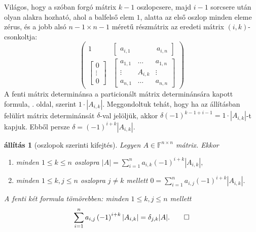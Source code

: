 \documentclass[9pt, a4paper, showtrims]{memoir}
\makeatletter
\renewenvironment{proof}[1][\proofname]
    {\par\pushQED{\qed}%
    \normalfont \topsep6\p@\@plus6\p@\relax
    \trivlist
    \item[\hskip\labelsep
        \itshape
    #1\@addpunct{:}]\ignorespaces}
    {\popQED\endtrivlist\@endpefalse}
\theoremstyle{plain}
\newtheorem{proposition}{állítás}[chapter]
\theoremstyle{remark}
\theoremstyle{definition}
\makeatother
\begin{document}
\begin{proof}
	Világos, hogy a szóban forgó mátrix $k-1$ oszlopcsere, 
    majd $i-1$ sorcsere után olyan alakra hozható,
	ahol a balfelső elem $1$, alatta az első oszlop minden eleme zérus,
	és a jobb alsó $n-1\times n-1$ méretű részmátrix az eredeti mátrix $\left( i,k \right)$-csonkoltja:
	\[
		\begin{pmatrix}
			1 & \begin{bmatrix}
				a_{i,1}\, & \phantom{A_{i,k}} & \,a_{i,n}
			\end{bmatrix} \\
			\begin{bmatrix}
				0      \\
				\vdots \\
				0
			\end{bmatrix}
			  &
			\begin{bmatrix}
				a_{1,1} & \dots   & a_{1,n} \\
				\vdots  & A_{i,k} & \vdots  \\
				a_{n,1} & \dots   & a_{n,n}
			\end{bmatrix}
		\end{pmatrix}
	\]
	A fenti mátrix determinánsa a particionált mátrix determinánsára kapott formula,
	. oldal,
	szerint $1\cdot|A_{i,k}|$.
	Meggondoltuk tehát, hogy ha az állításban felülírt mátrix determinánsát $\delta$-val jelöljük,
	akkor  $\delta\left( -1 \right)^{k-1+i-1}=1\cdot|A_{i,k}|$-t kapjuk.
	Ebből persze
	\begin{math}
		\delta
		=\left( -1 \right)^{i+k}|A_{i,k}|.
	\end{math}
\end{proof}
\begin{proposition}[oszlopok szerinti kifejtés]
	Legyen $A\in\mathbb{F}^{n\times n}$ mátrix.
	Ekkor
	\begin{enumerate}
		\item minden $1\leq k\leq n$ oszlopra
		      \(
		      |A|=
		      \sum_{i=1}^na_{i,k}\left( -1 \right)^{i+k}|A_{i,k}|,
		      \)
		\item minden $1\leq k,j\leq n$ oszlopra $j\neq k$ mellett
		      \(
		      0=
		      \sum_{i=1}^na_{i,j}\left( -1 \right)^{i+k}|A_{i,k}|.
		      \)
	\end{enumerate}
	A fenti két formula tömörebben: minden $1\leq k,j\leq n$ mellett
	\[
		\sum_{i=1}^na_{i,j}\left( -1 \right)^{i+k}|A_{i,k}|
		=
		\delta_{j,k}|A|.\qedhere
	\]
\end{proposition}
\end{document}
